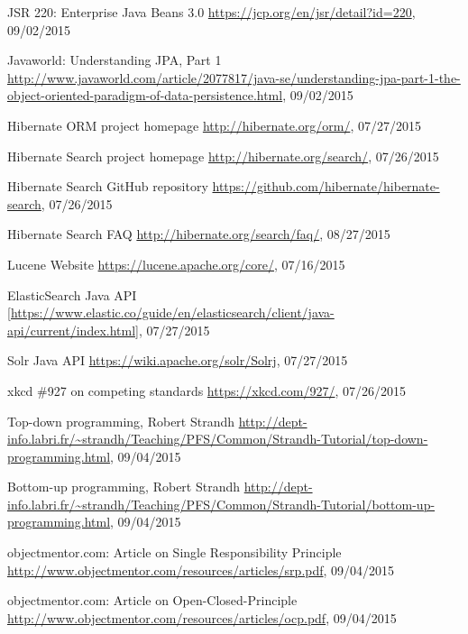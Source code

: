 \begin{thebibliography}{100}

	 JSR 220: Enterprise Java Beans 3.0
	\url{https://jcp.org/en/jsr/detail?id=220}, 09/02/2015

	 Javaworld: Understanding JPA, Part 1
	\url{http://www.javaworld.com/article/2077817/java-se/understanding-jpa-part-1-the-object-oriented-paradigm-of-data-persistence.html}, 09/02/2015

	 Hibernate ORM project homepage
	\url{http://hibernate.org/orm/}, 07/27/2015

	 Hibernate Search project homepage
	\url{http://hibernate.org/search/}, 07/26/2015

	 Hibernate Search GitHub repository
	\url{https://github.com/hibernate/hibernate-search}, 07/26/2015

	 Hibernate Search FAQ
	\url{http://hibernate.org/search/faq/}, 08/27/2015

	 Lucene Website
	\url{https://lucene.apache.org/core/}, 07/16/2015

	 ElasticSearch Java API
	\url{[https://www.elastic.co/guide/en/elasticsearch/client/java-api/current/index.html]}, 07/27/2015

	 Solr Java API
	\url{https://wiki.apache.org/solr/Solrj}, 07/27/2015

	 xkcd \#927 on competing standards
	\url{https://xkcd.com/927/}, 07/26/2015

	 Top-down programming, Robert Strandh
	\url{http://dept-info.labri.fr/~strandh/Teaching/PFS/Common/Strandh-Tutorial/top-down-programming.html},
	09/04/2015

	 Bottom-up programming, Robert Strandh
	\url{http://dept-info.labri.fr/~strandh/Teaching/PFS/Common/Strandh-Tutorial/bottom-up-programming.html},
	09/04/2015

	 objectmentor.com: Article on Single Responsibility Principle
	\url{http://www.objectmentor.com/resources/articles/srp.pdf}, 09/04/2015

	 objectmentor.com: Article on Open-Closed-Principle
	\url{http://www.objectmentor.com/resources/articles/ocp.pdf}, 09/04/2015


\end{thebibliography}
